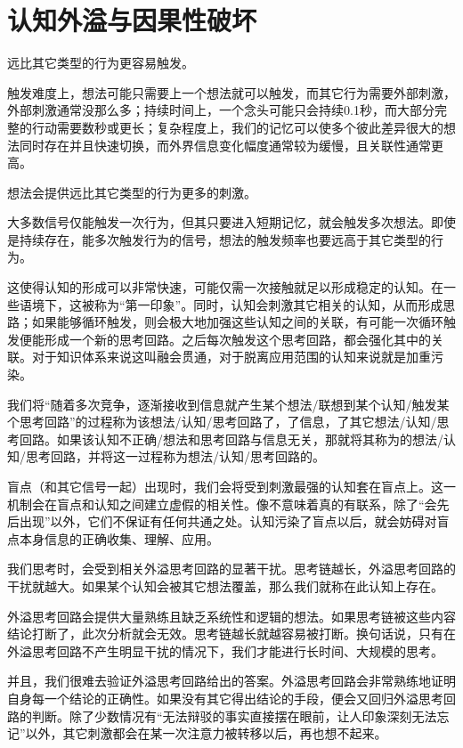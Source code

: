 \section{认知外溢与因果性破坏}
\noindent{}远比其它类型的行为更容易触发。
\begin{explain}
触发难度上，想法可能只需要上一个想法就可以触发，而其它行为需要外部刺激，外部刺激通常没那么多；持续时间上，一个念头可能只会持续0.1秒，而大部分完整的行动需要数秒或更长；复杂程度上，我们的记忆可以使多个彼此差异很大的想法同时存在并且快速切换，而外界信息变化幅度通常较为缓慢，且关联性通常更高。
\end{explain}
想法会提供远比其它类型的行为更多的刺激。
\begin{explain}
大多数信号仅能触发一次行为，但其只要进入短期记忆，就会触发多次想法。即使是持续存在，能多次触发行为的信号，想法的触发频率也要远高于其它类型的行为。

这使得认知的形成可以非常快速，可能仅需一次接触就足以形成稳定的认知。在一些语境下，这被称为“第一印象”。同时，认知会刺激其它相关的认知，从而形成思路；如果能够循环触发，则会极大地加强这些认知之间的关联，有可能一次循环触发便能形成一个新的思考回路。之后每次触发这个思考回路，都会强化其中的关联。对于知识体系来说这叫融会贯通，对于脱离应用范围的认知来说就是加重污染。
\end{explain}
我们将“随着多次竞争，逐渐接收到信息就产生某个想法/联想到某个认知/触发某个思考回路”的过程称为该想法/认知/思考回路了，了信息，了其它想法/认知/思考回路。如果该认知不正确/想法和思考回路与信息无关，那就将其称为的想法/认知/思考回路，并将这一过程称为想法/认知/思考回路的\label{def:外溢认知}。
\begin{examples}
盲点（和其它信号一起）出现时，我们会将受到刺激最强的认知套在盲点上。这一机制会在盲点和认知之间建立虚假的相关性。像不意味着真的有联系，除了“会先后出现”以外，它们不保证有任何共通之处。认知污染了盲点以后，就会妨碍对盲点本身信息的正确收集、理解、应用。
\end{examples}
我们思考时，会受到相关外溢思考回路的显著干扰。思考链越长，外溢思考回路的干扰就越大。如果某个认知会被其它想法覆盖，那么我们就称在此认知上存在。
\begin{explain}
外溢思考回路会提供大量熟练且缺乏系统性和逻辑的想法。如果思考链被这些内容结论打断了，此次分析就会无效。思考链越长就越容易被打断。换句话说，只有在外溢思考回路不产生明显干扰的情况下，我们才能进行长时间、大规模的思考。

并且，我们很难去验证外溢思考回路给出的答案。外溢思考回路会非常熟练地证明自身每一个结论的正确性。如果没有其它得出结论的手段，便会又回归外溢思考回路的判断。除了少数情况有“无法辩驳的事实直接摆在眼前，让人印象深刻无法忘记”以外，其它刺激都会在某一次注意力被转移以后，再也想不起来。
\end{explain}
